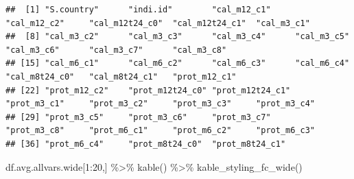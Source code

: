 \documentclass[
]{book}
\newenvironment{Shaded}{\begin{snugshade}}{\end{snugshade}}
\newcommand{\DecValTok}[1]{\textcolor[rgb]{0.00,0.00,0.81}{#1}}
\newcommand{\FunctionTok}[1]{\textcolor[rgb]{0.00,0.00,0.00}{#1}}
\newcommand{\NormalTok}[1]{#1}
\newcommand{\SpecialCharTok}[1]{\textcolor[rgb]{0.00,0.00,0.00}{#1}}
\begin{document}
\begin{verbatim}
##  [1] "S.country"      "indi.id"        "cal_m12_c1"     "cal_m12_c2"     "cal_m12t24_c0"  "cal_m12t24_c1"  "cal_m3_c1"     
##  [8] "cal_m3_c2"      "cal_m3_c3"      "cal_m3_c4"      "cal_m3_c5"      "cal_m3_c6"      "cal_m3_c7"      "cal_m3_c8"     
## [15] "cal_m6_c1"      "cal_m6_c2"      "cal_m6_c3"      "cal_m6_c4"      "cal_m8t24_c0"   "cal_m8t24_c1"   "prot_m12_c1"   
## [22] "prot_m12_c2"    "prot_m12t24_c0" "prot_m12t24_c1" "prot_m3_c1"     "prot_m3_c2"     "prot_m3_c3"     "prot_m3_c4"    
## [29] "prot_m3_c5"     "prot_m3_c6"     "prot_m3_c7"     "prot_m3_c8"     "prot_m6_c1"     "prot_m6_c2"     "prot_m6_c3"    
## [36] "prot_m6_c4"     "prot_m8t24_c0"  "prot_m8t24_c1"
\end{verbatim}

\begin{Shaded}
\begin{Highlighting}[]
\NormalTok{df.avg.allvars.wide[}\DecValTok{1}\SpecialCharTok{:}\DecValTok{20}\NormalTok{,] }\SpecialCharTok{\%\textgreater{}\%} \FunctionTok{kable}\NormalTok{() }\SpecialCharTok{\%\textgreater{}\%} \FunctionTok{kable\_styling\_fc\_wide}\NormalTok{()}
\end{Highlighting}
\end{Shaded}
\end{document}
